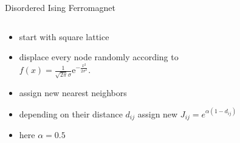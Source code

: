 \documentclass{beamer}
\begin{document}
        \begin{frame}{Disordered Ising Ferromagnet}
            \begin{columns}[t]
                \begin{column}{5cm}
                    \begin{itemize}
                        \item<1-> start with square lattice
                        \item<2-> displace every node randomly according to\\
                            \(f(x)=\frac{1}{\sqrt{2\pi}\sigma}\mathrm{e}^{-\frac{x^2}{2\sigma^2}}.\){}
                        \item<3-> assign new nearest neighbors
                        \item<4-> depending on their distance \(d_{ij}\) assign new \(J_{ij} = e^{\alpha(1-d_{ij})}\)
                        \item<4-> here \(\alpha = 0.5\)
                    \end{itemize}
                \end{column}
                \begin{column}{6cm}
                \end{column}
            \end{columns}
        \end{frame}
\end{document}

